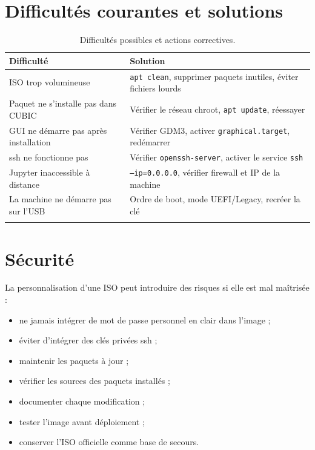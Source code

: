 \section{Difficultés courantes et solutions}

\begin{longtable}{p{5cm}p{9cm}}
\toprule
\textbf{Difficulté} & \textbf{Solution} \\
\midrule
\endhead
ISO trop volumineuse                 & \texttt{apt clean}, supprimer paquets inutiles, éviter fichiers lourds \\
\addlinespace
Paquet ne s'installe pas dans CUBIC  & Vérifier le réseau chroot, \texttt{apt update}, réessayer \\
\addlinespace
GUI ne démarre pas après installation & Vérifier GDM3, activer \texttt{graphical.target}, redémarrer \\
\addlinespace
\acrshort{ssh} ne fonctionne pas     & Vérifier \texttt{openssh-server}, activer le service \texttt{ssh} \\
\addlinespace
Jupyter inaccessible à distance      & \texttt{--ip=0.0.0.0}, vérifier firewall et IP de la machine \\
\addlinespace
La machine ne démarre pas sur l'USB  & Ordre de boot, mode UEFI/Legacy, recréer la clé \\
\bottomrule
\caption{Difficultés possibles et actions correctives.}
\end{longtable}

\section{Sécurité}

La personnalisation d'une ISO peut introduire des risques si elle est mal maîtrisée :

\begin{itemize}[leftmargin=*]
    \item ne jamais intégrer de mot de passe personnel en clair dans l'image ;
    \item éviter d'intégrer des clés privées \acrshort{ssh} ;
    \item maintenir les paquets à jour ;
    \item vérifier les sources des paquets installés ;
    \item documenter chaque modification ;
    \item tester l'image avant déploiement ;
    \item conserver l'ISO officielle comme base de secours.
\end{itemize}

